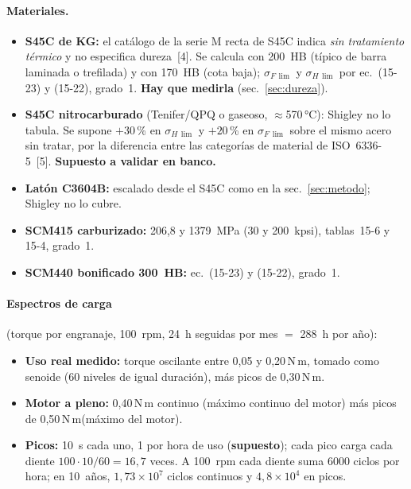 \documentclass[11pt,a4paper]{article}
\newcommand{\Nm}{\,N\,m\xspace}
\begin{document}
\paragraph{Materiales.}
\begin{itemize}
  \item \textbf{S45C de KG:} el catálogo de la serie M recta de S45C indica \emph{sin tratamiento térmico} y no especifica
        dureza~[4]. Se calcula con 200~HB (típico de barra laminada o trefilada) y con 170~HB (cota baja);
        $\sigma_{F\,\lim}$ y $\sigma_{H\,\lim}$ por ec.~(15-23) y (15-22), grado~1. \textbf{Hay que medirla} (sec.~\ref{sec:dureza}).
  \item \textbf{S45C nitrocarburado} (Tenifer/QPQ o gaseoso, $\approx$570\,°C): Shigley no lo tabula. Se supone
        $+30$\,\% en $\sigma_{H\,\lim}$ y $+20$\,\% en $\sigma_{F\,\lim}$ sobre el mismo acero sin tratar, por la diferencia entre
        las categorías de material de ISO~6336-5~[5]. \textbf{Supuesto a validar en banco.}
  \item \textbf{Latón C3604B:} escalado desde el S45C como en la sec.~\ref{sec:metodo}; Shigley no lo cubre.
  \item \textbf{SCM415 carburizado:} 206,8 y 1379~MPa (30 y 200~kpsi), tablas~15-6 y 15-4, grado~1.
  \item \textbf{SCM440 bonificado 300~HB:} ec.~(15-23) y (15-22), grado~1.
\end{itemize}

\paragraph{Espectros de carga} (torque por engranaje, 100~rpm, 24~h seguidas por mes $=$ 288~h por año):
\begin{itemize}
  \item \textbf{Uso real medido:} torque oscilante entre 0,05 y 0,20\Nm, tomado como senoide (60 niveles de igual duración),
        más picos de 0,30\Nm.
  \item \textbf{Motor a pleno:} 0,40\Nm continuo (máximo continuo del motor) más picos de 0,50\Nm (máximo del motor).
  \item \textbf{Picos:} 10~s cada uno, 1 por hora de uso (\textbf{supuesto}); cada pico carga cada diente
        $100\cdot10/60=16{,}7$ veces. A 100~rpm cada diente suma 6000 ciclos por hora; en 10~años, $1{,}73\times10^7$
        ciclos continuos y $4{,}8\times10^4$ en picos.
\end{itemize}
\end{document}
